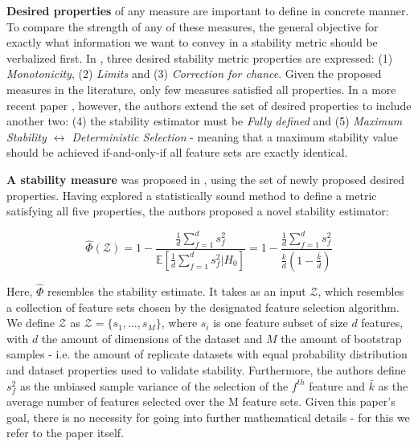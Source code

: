 \documentclass{article}
\begin{document}
\textbf{Desired properties} of any measure are important to define in concrete manner. To compare the strength of any of these measures, the general objective for exactly what information we want to convey in a stability metric should be verbalized first. In \citep{mohana2016survey}, three desired stability metric properties are expressed: (1) \textit{Monotonicity}, (2) \textit{Limits} and (3) \textit{Correction for chance}. Given the proposed measures in the literature, only few measures satisfied all properties. In a more recent paper \citep{nogueira2017stability}, however, the authors extend the set of desired properties to include another two: (4) the stability estimator must be \textit{Fully defined} and (5) \textit{Maximum Stability $\leftrightarrow$ Deterministic Selection} - meaning that a maximum stability value should be achieved if-and-only-if all feature sets are exactly identical.

\textbf{A stability measure} was proposed in \citep{nogueira2017stability}, using the set of newly proposed desired properties. Having explored a statistically sound method to define a metric satisfying all five properties, the authors proposed a novel stability estimator:


\begin{equation}\label{eq:stability-measure}
\hat{\Phi}(\mathcal{Z})=1-\frac{\frac{1}{d} \sum_{f=1}^{d} s_{f}^{2}}{\mathbb{E}\left[\frac{1}{d} \sum_{f=1}^{d} s_{f}^{2} | H_{0}\right]}=1-\frac{\frac{1}{d} \sum_{f=1}^{d} s_{f}^{2}}{\frac{k}{d}\left(1-\frac{\bar{k}}{d}\right)}
\end{equation}

Here, $\hat{\Phi}$ resembles the stability estimate. It takes as an input $\mathcal{Z}$, which resembles a collection of feature sets chosen by the designated feature selection algorithm. We define $\mathcal{Z}$ as $\mathcal{Z} = \{s_1,...,s_M\}$, where $s_i$ is one feature subset of size $d$ features, with $d$ the amount of dimensions of the dataset and $M$ the amount of bootstrap samples - i.e. the amount of replicate datasets with equal probability distribution and dataset properties used to validate stability. Furthermore, the authors define $s_{f}^{2}$ as the unbiased sample variance of the selection of the $f^{t h}$ feature and $\bar{k}$ as the average number of features selected over the M feature sets. Given this paper's goal, there is no necessity for going into further mathematical details - for this we refer to the paper itself.
\end{document}
